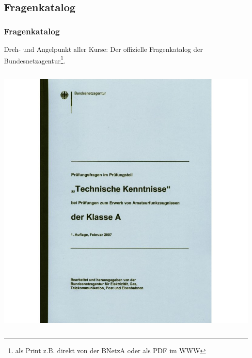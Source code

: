 \subsection{Fragenkatalog}

\begin{frame}
    \frametitle{Fragenkatalog}

    Dreh- und Angelpunkt aller Kurse: Der offizielle Fragenkatalog der
    Bundesnetzagentur\footnote{als Print z.B. direkt von der BNetzA oder als PDF im WWW}.

    \begin{columns}[c]
        \column[c]{5cm}
        \begin{center}
            \includegraphics[width=1\textwidth,height=1\textheight,keepaspectratio]{a00/Fragenkatalog-Klasse-A-Technische-Kenntnisse.jpg}
            \tiny \hyperlink{refs}{\cite{darcv}}
        \end{center}
        \column{5cm}
    \end{columns}

\end{frame}

